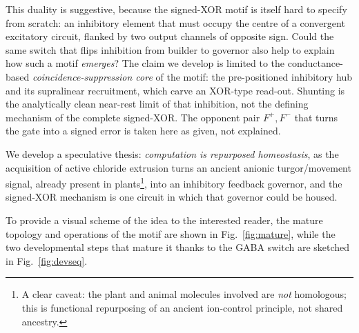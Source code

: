 \documentclass[11pt,a4paper]{article}
\begin{document}
This duality is suggestive, because the signed-XOR motif is itself hard to specify from scratch: an inhibitory element that must occupy the centre of a convergent excitatory circuit, flanked by two output channels of opposite sign. Could the same switch that flips inhibition from builder to governor also help to explain how such a motif \emph{emerges}? The claim we develop is limited to the conductance-based \emph{coincidence-suppression core} of the motif: the pre-positioned inhibitory hub and its supralinear recruitment, which carve an XOR-type read-out. Shunting is the analytically clean near-rest limit of that inhibition, not the defining mechanism of the complete signed-XOR. The opponent pair $F^{+},F^{-}$ that turns the gate into a signed error is taken here as given, not explained. 

We develop a speculative thesis: \emph{computation is repurposed homeostasis}, as the acquisition of active chloride extrusion turns an ancient anionic turgor/movement signal, already present in plants\footnote{A clear caveat: the plant and animal molecules involved are \emph{not} homologous; this is functional repurposing of an ancient ion-control principle, not shared ancestry.}, into an inhibitory feedback governor, and the signed-XOR mechanism is one circuit in which that governor could be housed.  

To provide a visual scheme of the idea to the interested reader, the mature topology and operations of the motif are shown in Fig.~\ref{fig:mature}, while the two developmental steps that mature it thanks to the GABA switch are sketched in Fig.~\ref{fig:devseq}.


\end{document}
